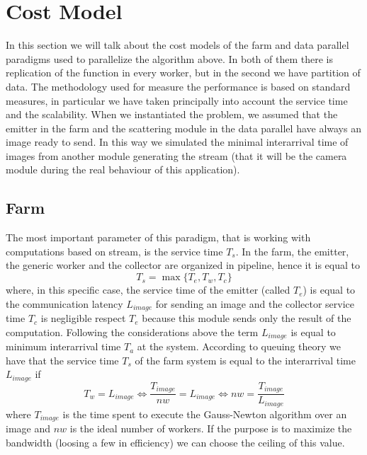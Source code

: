 \section{Cost Model}

In this section we will talk about the cost models of the farm and data parallel paradigms used to parallelize the algorithm above. In both of them there is replication of the function in every worker, but in the second we have partition of data. The methodology used for measure the performance is based on standard measures, in particular we have taken principally into account the service time and the scalability. When we instantiated the problem, we assumed that the emitter in the farm and the scattering module in the data parallel have always an image ready to send. In this way we simulated the minimal interarrival time of images from another module generating the stream (that it will be the camera module during the real behaviour of this application).

\subsection{Farm}

The most important parameter of this paradigm, that is working with computations based on stream, is the service time $T_{s}$. In the farm, the emitter, the generic worker and the collector are organized in pipeline, hence it is equal to
\[
T_{s} = \max \lbrace T_{e}, T_{w}, T_{c}\rbrace
\]
where, in this specific case, the service time of the emitter (called $T_{e}$) is equal to the communication latency $L_{image}$ for sending an image and the collector service time $T_{c}$ is negligible respect $T_{e}$ because this module sends only the result of the computation. Following the considerations above the term $L_{image}$ is equal to minimum interarrival time $T_{a}$ at the system. According to queuing theory we have that the service time $T_{s}$ of the farm system is equal to the interarrival time $L_{image}$ if
\[
T_{w} = L_{image} \Leftrightarrow \frac{T_{image}}{nw} = L_{image} \Leftrightarrow nw = \frac{T_{image}}{L_{image}} 
\]
where $T_{image}$ is the time spent to execute the Gauss-Newton algorithm over an image and $nw$ is the ideal number of workers. If the purpose is to maximize the bandwidth (loosing a few in efficiency) we can choose the ceiling of this value.

